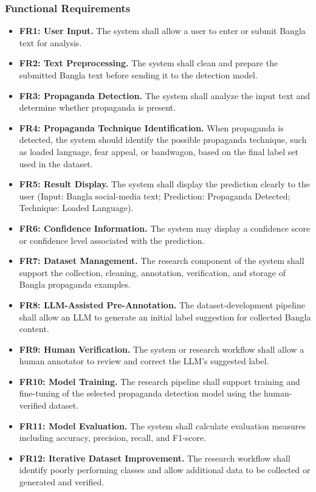 \subsubsection*{Functional Requirements}
\begin{itemize}
  \item \textbf{FR1: User Input.} The system shall allow a user to enter or submit
        Bangla text for analysis.
  \item \textbf{FR2: Text Preprocessing.} The system shall clean and prepare the
        submitted Bangla text before sending it to the detection model.
  \item \textbf{FR3: Propaganda Detection.} The system shall analyze the input text
        and determine whether propaganda is present.
  \item \textbf{FR4: Propaganda Technique Identification.} When propaganda is
        detected, the system should identify the possible propaganda technique,
        such as loaded language, fear appeal, or bandwagon, based on the final
        label set used in the dataset.
  \item \textbf{FR5: Result Display.} The system shall display the prediction
        clearly to the user (Input: Bangla social-media text; Prediction:
        Propaganda Detected; Technique: Loaded Language).
  \item \textbf{FR6: Confidence Information.} The system may display a confidence
        score or confidence level associated with the prediction.
  \item \textbf{FR7: Dataset Management.} The research component of the system
        shall support the collection, cleaning, annotation, verification, and
        storage of Bangla propaganda examples.
  \item \textbf{FR8: LLM-Assisted Pre-Annotation.} The dataset-development
        pipeline shall allow an LLM to generate an initial label suggestion for
        collected Bangla content.
  \item \textbf{FR9: Human Verification.} The system or research workflow shall
        allow a human annotator to review and correct the LLM's suggested label.
  \item \textbf{FR10: Model Training.} The research pipeline shall support training
        and fine-tuning of the selected propaganda detection model using the
        human-verified dataset.
  \item \textbf{FR11: Model Evaluation.} The system shall calculate evaluation
        measures including accuracy, precision, recall, and F1-score.
  \item \textbf{FR12: Iterative Dataset Improvement.} The research workflow shall
        identify poorly performing classes and allow additional data to be
        collected or generated and verified.
\end{itemize}

